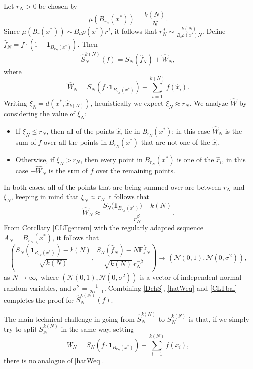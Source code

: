 \documentclass[11pt,twoside,a4paper,reqno]{amsart}
\newcommand{\E}{\mathbb{E}}
\def\one{{\mathbf{1}}}
\begin{document}
Let $r_N>0$ be chosen by
$$
\mu(B_{r_N}(x^*))=\frac{k(N)}{N}.
$$
Since $\mu(B_r(x^*)) \sim B_d \rho(x^*) r^d$, it follows that $r_N^d\sim \frac{k(N)}{B_d \rho(x^*) N}$.
Define $\hat{f}_N = f\cdot \left(1-\one_{B_{r_N}(x^*)} \right).$ Then
\begin{equation}\label{DchS}
\hat{S}_N^{k(N)}(f)= S_N(\hat{f}_N)+\hat{W}_N,
\end{equation}
where
$$\hat{W}_N=S_N\left(f \cdot \one_{B_{r_N}(x^*)}\right)-\sum_{i=1}^{k(N)} f(\hat{x}_i).$$
Writing $\xi_N=d(x^*,\hat{x}_{k(N)})$, heuristically we expect $\xi_N\approx r_N$. We analyze $\hat{W}$ by considering the value of $\xi_N$:
\begin{itemize}
\item If $\xi_N\leq r_N$, then all of the points $\hat{x}_i$ lie in $B_{r_N}(x^*)$; in this case $\hat{W}_N$ is the sum of $f$ over all the points in $B_{r_N}(x^*)$ that are not one of the $\hat{x}_i$,
\item Otherwise, if $\xi_N>r_N$, then every point in $B_{r_N}(x^*)$ is one of the $\hat{x}_i$, in this case $-\hat{W}_N$ is the sum of $f$ over the remaining points.
\end{itemize}
In both cases, all of the points that are being summed over are between $r_N$ and $\xi_N$, keeping in mind that $\xi_N \approx r_N$ it follows that
\begin{equation}\label{hatWeq}
\hat{W}_N \approx \frac{S_N\bigl(\one_{B_{r_N}(x^*)}\bigr)-k(N)}{r_N^{\beta}}.
\end{equation}
From Corollary \ref{CLTgenrem} with the regularly adapted sequence $A_N=B_{r_N}(x^*)$, it follows that
\begin{equation}\label{CLTbal}
\left(\frac{S_N\left(\one_{B_{r_N}(x^*)}\right)-k(N)}{\sqrt{k(N)}},\, \frac{S_N(\hat{f}_N)-N\E\hat{f}_N}{\sqrt{k(N)}\,r_N^{-\beta}}\right) \Rightarrow (\mathcal{N}(0,1), \mathcal{N}(0,\sigma^2)),
\end{equation}
as $N\to\infty,$ where $(\mathcal{N}(0,1), \mathcal{N}(0,\sigma^2))$ is a vector of independent normal random variables, and
$\sigma^2=\frac{1}{2\alpha-1}.$ Combining \eqref{DchS}, \eqref{hatWeq} and \eqref{CLTbal} completes the proof for $\hat{S}_N^{k(N)}(f)$.



The main technical challenge in going from $\hat{S}_N^{k(N)}$ to $S_N^{k(N)}$ is that, if we simply try to split $S_N^{k(N)}$ in the same way, setting
\begin{equation*}
W_N = S_N\left(f \cdot \one_{B_{r_N}(x^*)}\right) - \sum_{i=1}^{k(N)} f(x_i),
\end{equation*}
there is no analogue of \eqref{hatWeq}.
\end{document}
